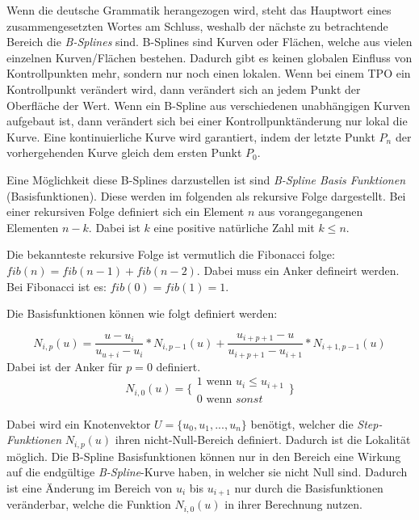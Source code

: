 \documentclass[11pt]{article}
\begin{document}
Wenn die deutsche Grammatik herangezogen wird, steht das Hauptwort eines zusammengesetzten Wortes am Schluss, weshalb der nächste zu betrachtende Bereich die \emph{B-Splines} sind. 
B-Splines sind Kurven oder Flächen, welche aus vielen einzelnen Kurven/Flächen bestehen. 
Dadurch gibt es keinen globalen Einfluss von Kontrollpunkten mehr, sondern nur noch einen lokalen. 
Wenn bei einem TPO ein Kontrollpunkt verändert wird, dann verändert sich an jedem Punkt der Oberfläche der Wert.
Wenn ein B-Spline aus verschiedenen unabhängigen Kurven aufgebaut ist, dann verändert sich bei einer Kontrollpunktänderung nur lokal die Kurve. 
Eine kontinuierliche Kurve wird garantiert, indem der letzte Punkt $P_{n}$ der vorhergehenden Kurve gleich dem ersten Punkt $P_{0}$. 

Eine Möglichkeit diese B-Splines darzustellen ist sind \emph{B-Spline Basis Funktionen} (Basisfunktionen). 
Diese werden im folgenden als rekursive Folge dargestellt.
Bei einer rekursiven Folge definiert sich ein Element $n$ aus vorangegangenen Elementen $n-k$.
Dabei ist $k$ eine positive natürliche Zahl mit $k \leq n$.

Die bekannteste rekursive Folge ist vermutlich die Fibonacci folge: $fib(n) = fib(n-1) + fib(n-2)$.
Dabei muss ein Anker defineirt werden.
Bei Fibonacci ist es: $fib(0) = fib(1) = 1$.

Die Basisfunktionen können wie folgt definiert werden:

\begin{equation}
N_{i,p}(u) = \frac{u-u_{i}}{u_{u+i}-u_{i}} * N_{i,p-1}(u) + \frac{u_{i+p+1} - u}{u_{i+p+1} - u_{i+1}} * N_{i+1,p-1}(u)
\end{equation}
Dabei ist der Anker für $p = 0$ definiert. 
\begin{equation}
N_{i,0}(u) = \Biggl\{ \substack{1 \text{ wenn } u_{i} \leq u_{i+1} \\ 0 \text{ wenn }sonst}\Biggr\}
\end{equation}

Dabei wird ein Knotenvektor $U = \{u_{0}, u_{1}, ..., u_{n}\}$ benötigt, welcher die \emph{Step-Funktionen} $N_{i,p}(u)$ ihren nicht-Null-Bereich definiert.
Dadurch ist die Lokalität möglich.
Die B-Spline Basisfunktionen können nur in den Bereich eine Wirkung auf die endgültige \emph{B-Spline}-Kurve haben, in welcher sie nicht Null sind. 
Dadurch ist eine Änderung im Bereich von $u_{i}$ bis $u_{i+1}$ nur durch die Basisfunktionen veränderbar, welche die Funktion $N_{i,0}(u)$ in ihrer Berechnung nutzen.
\end{document}

